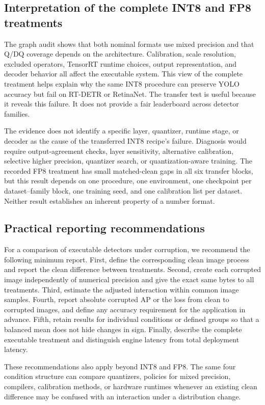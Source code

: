 \documentclass[a4paper,fleqn]{cas-dc}
\begin{document}
\subsection{Interpretation of the complete INT8 and FP8 treatments}

The graph audit shows that both nominal formats use mixed precision and that Q/DQ coverage depends on the architecture. Calibration, scale resolution, excluded operators, TensorRT runtime choices, output representation, and decoder behavior all affect the executable system. This view of the complete treatment helps explain why the same INT8 procedure can preserve YOLO accuracy but fail on RT-DETR or RetinaNet. The transfer test is useful because it reveals this failure. It does not provide a fair leaderboard across detector families.

The evidence does not identify a specific layer, quantizer, runtime stage, or decoder as the cause of the transferred INT8 recipe's failure. Diagnosis would require output-agreement checks, layer sensitivity, alternative calibration, selective higher precision, quantizer search, or quantization-aware training. The recorded FP8 treatment has small matched-clean gaps in all six transfer blocks, but this result depends on one procedure, one environment, one checkpoint per dataset--family block, one training seed, and one calibration list per dataset. Neither result establishes an inherent property of a number format.

\subsection{Practical reporting recommendations}

For a comparison of executable detectors under corruption, we recommend the following minimum report. First, define the corresponding clean image process and report the clean difference between treatments. Second, create each corrupted image independently of numerical precision and give the exact same bytes to all treatments. Third, estimate the adjusted interaction within common image samples. Fourth, report absolute corrupted AP or the loss from clean to corrupted images, and define any accuracy requirement for the application in advance. Fifth, retain results for individual conditions or defined groups so that a balanced mean does not hide changes in sign. Finally, describe the complete executable treatment and distinguish engine latency from total deployment latency.

These recommendations also apply beyond INT8 and FP8. The same four condition structure can compare quantizers, policies for mixed precision, compilers, calibration methods, or hardware runtimes whenever an existing clean difference may be confused with an interaction under a distribution change.
\end{document}
